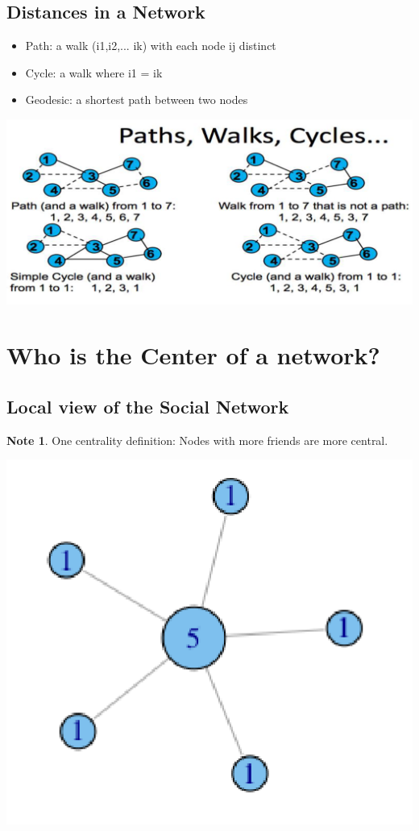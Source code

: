 \documentclass[11pt]{article}
\theoremstyle{definition}
\newtheorem{note}{Note}
\begin{document}
\subsection{Distances in a Network}
\begin{itemize}
    \item Path: a walk (i1,i2,... ik) with each node ij distinct
    \item Cycle: a walk where i1 = ik
    \item Geodesic: a shortest path between two nodes
\end{itemize}

\includegraphics[width=\textwidth/2]{12.png}

\section{Who is the Center of a network?}
\subsection{Local view of the Social Network}
\begin{note}
    One centrality definition:
Nodes with more friends are more central.
\end{note}
\includegraphics[width=\textwidth/5]{13.png}
\end{document}
